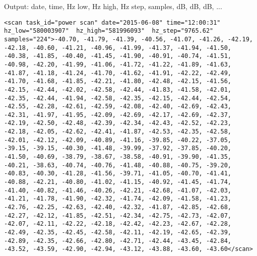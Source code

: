 Output:
date, time, Hz low, Hz high, Hz step, samples, dB, dB, dB, ...

\begin{lstlisting}
<scan task_id="power scan" date="2015-06-08" time="12:00:31" hz_low="580003907"  hz_high="581996093"  hz_step="9765.62" samples="224">-40.70, -41.79, -41.39, -40.56, -41.07, -41.26, -42.19, -42.18, -40.60, -41.21, -40.96, -41.99, -41.37, -41.94, -41.50, -40.38, -41.85, -40.40, -41.45, -41.90, -40.91, -40.74, -41.51, -40.98, -42.20, -41.99, -41.06, -41.72, -41.22, -41.89, -41.63, -41.87, -41.18, -41.24, -41.70, -41.62, -41.91, -42.22, -42.49, -41.70, -41.68, -41.85, -42.21, -41.80, -42.48, -42.15, -41.56, -42.15, -42.44, -42.02, -42.58, -42.44, -41.83, -41.58, -42.01, -42.35, -42.44, -41.94, -42.58, -42.35, -42.15, -42.44, -42.54, -42.55, -42.28, -42.61, -42.59, -42.08, -42.40, -42.69, -42.43, -42.31, -41.97, -41.95, -42.09, -42.69, -42.17, -42.69, -42.37, -42.19, -42.50, -42.48, -42.39, -42.34, -42.43, -42.52, -42.23, -42.18, -42.05, -42.62, -42.41, -41.87, -42.53, -42.35, -42.58, -42.01, -42.12, -42.09, -40.89, -41.16, -39.85, -40.22, -37.05, -39.15, -39.15, -40.30, -41.48, -39.99, -37.92, -37.85, -40.20, -41.50, -40.69, -38.79, -38.67, -38.58, -40.91, -39.90, -41.35, -40.21, -38.63, -40.74, -40.76, -41.48, -40.88, -40.75, -39.20, -40.83, -40.30, -41.28, -41.56, -39.71, -41.05, -40.70, -41.41, -40.88, -42.21, -40.80, -41.02, -41.15, -40.92, -41.45, -41.74, -41.40, -40.82, -41.46, -40.26, -42.21, -42.68, -41.07, -42.03, -41.21, -41.78, -41.90, -42.32, -41.74, -42.09, -41.58, -41.23, -42.76, -42.25, -42.63, -42.40, -42.32, -41.87, -42.85, -42.68, -42.27, -42.12, -41.85, -42.51, -42.34, -42.75, -42.73, -42.07, -42.07, -42.11, -42.22, -42.18, -42.42, -42.23, -42.67, -42.28, -42.49, -42.35, -42.45, -42.58, -42.11, -42.19, -42.65, -42.39, -42.89, -42.35, -42.66, -42.80, -42.71, -42.44, -43.45, -42.84, -43.52, -43.59, -42.90, -42.94, -43.12, -43.88, -43.60, -43.60</scan>


\end{lstlisting}
